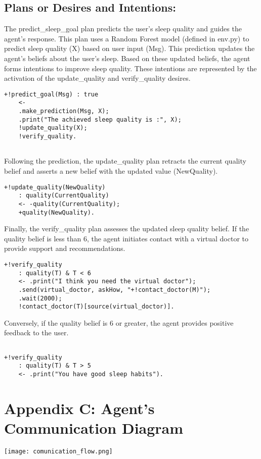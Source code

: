 \documentclass[conference]{IEEEtran}
\begin{document}
\subsection*{Plans or Desires and Intentions:}

The predict\_sleep\_goal plan predicts the user's sleep quality and guides the agent's response. This plan uses a Random Forest model (defined in env.py) to predict sleep quality (X) based on user input (Msg). This prediction updates the agent's beliefs about the user's sleep. Based on these updated beliefs, the agent forms intentions to improve sleep quality. These intentions are represented by the activation of the update\_quality and verify\_quality desires. 

\begin{verbatim}
+!predict_goal(Msg) : true
    <-  
    .make_prediction(Msg, X); 
    .print("The achieved sleep quality is :", X); 
    !update_quality(X); 
    !verify_quality. 
    
\end{verbatim}

Following the prediction, the update\_quality plan retracts the current quality belief and asserts a new belief with the updated value (NewQuality).

\begin{verbatim}
+!update_quality(NewQuality)
    : quality(CurrentQuality)  
    <- -quality(CurrentQuality);
    +quality(NewQuality).
\end{verbatim}

Finally, the verify\_quality plan assesses the updated sleep quality belief. If the quality belief is less than 6, the agent initiates contact with a virtual doctor to provide support and recommendations.

\begin{verbatim}
+!verify_quality
    : quality(T) & T < 6
    <- .print("I think you need the virtual doctor");
    .send(virtual_doctor, askHow, "+!contact_doctor(M)");
    .wait(2000); 
    !contact_doctor(T)[source(virtual_doctor)]. 
\end{verbatim}

Conversely, if the quality belief is 6 or greater, the agent provides positive feedback to the user.

\begin{verbatim}

+!verify_quality
    : quality(T) & T > 5
    <- .print("You have good sleep habits").
\end{verbatim}

\newpage %

\section*{Appendix C: Agent's Communication Diagram}

\texttt{[image: comunication\_flow.png]}
\end{document}
